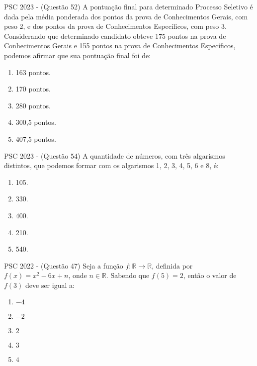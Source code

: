 \documentclass[aspectratio=169]{beamer}
\newif\ifusarcorvermelha
\newcommand{\vermelho}[1]{%
    \ifusarcorvermelha
        {\color{red}#1}%
    \else
        #1%
    \fi
}
\begin{document}
    \begin{frame}{PSC 2023 - (Questão 52)}
        A pontuação final para determinado Processo Seletivo é dada pela média ponderada dos pontos da prova de Conhecimentos Gerais, com peso 2, e dos pontos da prova de Conhecimentos Específicos, com peso 3. Considerando que determinado candidato obteve 175 pontos na prova de Conhecimentos Gerais e 155 pontos na prova de Conhecimentos Específicos, podemos afirmar que sua pontuação final foi de:

            \begin{enumerate}[a]
                \item \vermelho{163 pontos.} %
                \item 170 pontos.
                \item 280 pontos.
                \item 300,5 pontos.
                \item 407,5 pontos.
            \end{enumerate}
    
    \end{frame}

    \begin{frame}{PSC 2023 - (Questão 54)}
        A quantidade de números, com três algarismos distintos, que podemos formar com os algarismos 1, 2, 3, 4, 5, 6 e 8, é:

            \begin{enumerate}[a]
                \item 105.
                \item 330.
                \item 400.
                \item \vermelho{210.} %
                \item 540.
            \end{enumerate}
    
    \end{frame}

    \begin{frame}{PSC 2022 - (Questão 47)}
        Seja a função $f: \mathbb{R} \to \mathbb{R}$, definida por $f(x)=x^{2}-6x+n$, onde $n \in \mathbb{R}$. Sabendo que $f(5)=2$, então o valor de $f(3)$ deve ser igual a:

        \begin{enumerate}[a]
                \item $-4$
                \item \vermelho{$-2$} %
                \item $2$
                \item $3$
                \item $4$
            \end{enumerate}
    \end{frame}
   
\end{document}
